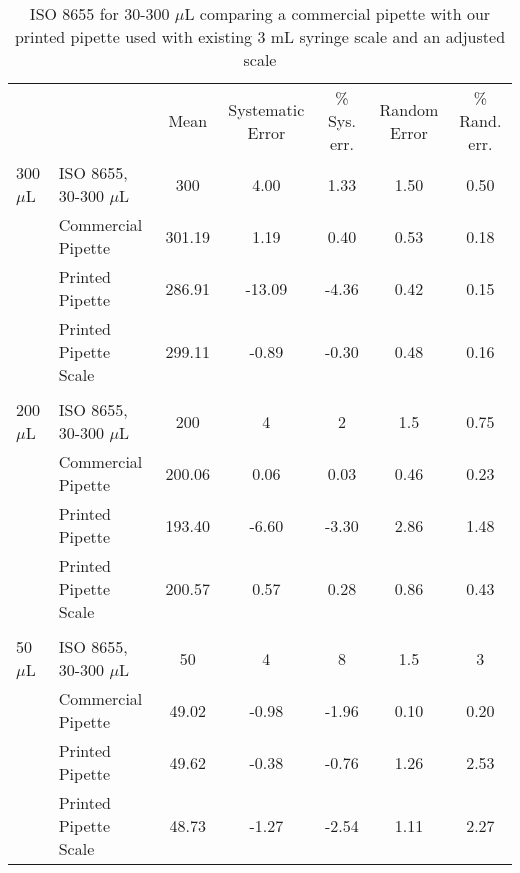 \documentclass{nature}
\begin{document}
\begin{table}
\begin{adjustwidth}{-0.75in}{0in} %
\centering
\caption{ISO 8655 for 30-300 $\mu$L comparing a commercial pipette with our printed pipette used with existing 3 mL syringe scale and an adjusted scale}
\label{table4}
\begin{tabular}{llccccc}
&                       & Mean   & Systematic Error & \% Sys. err. & Random Error & \% Rand. err. \\
300 $\mu$L & ISO 8655, 30-300 $\mu$L   & 300    & 4.00             & 1.33         & 1.50         & 0.50          \\
& Commercial Pipette    & 301.19 & 1.19             & 0.40         & 0.53         & 0.18          \\
& Printed Pipette       & 286.91 & -13.09           & -4.36        & 0.42         & 0.15          \\
& Printed Pipette Scale & 299.11 & -0.89            & -0.30        & 0.48         & 0.16          \\
&                       &        &                  &              &              &               \\
200 $\mu$L & ISO 8655, 30-300 $\mu$L   & 200    & 4                & 2            & 1.5          & 0.75          \\
& Commercial Pipette    & 200.06 & 0.06             & 0.03         & 0.46         & 0.23          \\
& Printed Pipette       & 193.40 & -6.60            & -3.30        & 2.86         & 1.48          \\
& Printed Pipette Scale & 200.57 & 0.57             & 0.28         & 0.86         & 0.43          \\
&                       &        &                  &              &              &               \\
50 $\mu$L  & ISO 8655, 30-300 $\mu$L   & 50     & 4                & 8            & 1.5          & 3             \\
& Commercial Pipette    & 49.02  & -0.98            & -1.96        & 0.10         & 0.20          \\
& Printed Pipette       & 49.62  & -0.38            & -0.76        & 1.26         & 2.53          \\
& Printed Pipette Scale & 48.73  & -1.27            & -2.54        & 1.11         & 2.27          \\

\end{tabular}
\end{adjustwidth}
\end{table}
\end{document}
